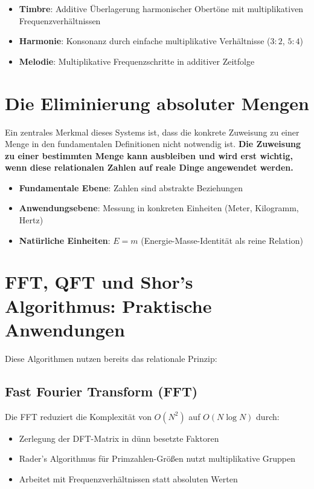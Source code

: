 	\begin{itemize}
		\item \textbf{Timbre}: Additive Überlagerung harmonischer Obertöne mit multiplikativen Frequenzverhältnissen
		\item \textbf{Harmonie}: Konsonanz durch einfache multiplikative Verhältnisse ($3:2$, $5:4$)
		\item \textbf{Melodie}: Multiplikative Frequenzschritte in additiver Zeitfolge
	\end{itemize}
	
	\section{Die Eliminierung absoluter Mengen}
	
	Ein zentrales Merkmal dieses Systems ist, dass die konkrete Zuweisung zu einer Menge in den fundamentalen Definitionen nicht notwendig ist. \textbf{Die Zuweisung zu einer bestimmten Menge kann ausbleiben und wird erst wichtig, wenn diese relationalen Zahlen auf reale Dinge angewendet werden.}
	
	\begin{definition}
		\begin{itemize}
			\item \textbf{Fundamentale Ebene}: Zahlen sind abstrakte Beziehungen
			\item \textbf{Anwendungsebene}: Messung in konkreten Einheiten (Meter, Kilogramm, Hertz)
			\item \textbf{Natürliche Einheiten}: $E = m$ (Energie-Masse-Identität als reine Relation)
		\end{itemize}
	\end{definition}
	
	\section{FFT, QFT und Shor's Algorithmus: Praktische Anwendungen}
	
	Diese Algorithmen nutzen bereits das relationale Prinzip:
	
	\subsection{Fast Fourier Transform (FFT)}
	
	Die FFT reduziert die Komplexität von $O(N^2)$ auf $O(N \log N)$ durch:
	\begin{itemize}
		\item Zerlegung der DFT-Matrix in dünn besetzte Faktoren
		\item Rader's Algorithmus für Primzahlen-Größen nutzt multiplikative Gruppen
		\item Arbeitet mit Frequenzverhältnissen statt absoluten Werten
	\end{itemize}
	

